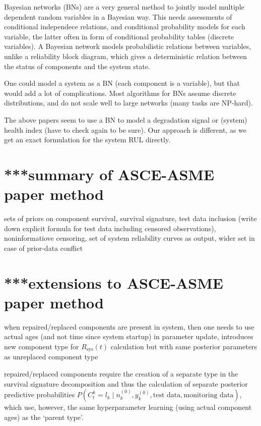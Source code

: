 \documentclass[authoryear]{elsarticle}
\newcommand{\uz}{^{(0)}} %
\newcommand{\Rsys}{R_\text{sys}}
\def\ykz{y\uz_k}
\def\nkz{n\uz_k}
\begin{document}
\begin{scriptsize}
Bayesian networks (BNs) are a very general method to jointly model multiple dependent random variables in a Bayesian way. 
This needs assessments of conditional independece relations, and conditional probability models for each variable,
the latter often in form of conditional probability tables (discrete variables).
A Bayesian network models probabilistic relations between variables,
unlike a reliability block diagram, which gives a deterministic relation
between the status of components and the system state.

One could model a system as a BN (each component is a variable),
but that would add a lot of complications.
Most algorithms for BNs assume discrete distributions,
and do not scale well to large networks (many tasks are NP-hard).

The above papers seem to use a BN to model a degradation signal or (system) health index (have to check again to be sure).
Our approach is different, as we get an exact formulation for the system RUL directly.

\end{scriptsize}


\section{***summary of ASCE-ASME paper method}

sets of priors on component survival,
survival signature,
test data inclusion
(write down explicit formula for test data including censored observations),
noninformatiove censoring,
set of system reliability curves as output,
wider set in case of prior-data conflict


\section{***extensions to ASCE-ASME paper method}
\label{sec:extensions}

when repaired/replaced components are present in system,
then one needs to use actual ages (and not time since system startup) in parameter update,
introduces new component type for $\Rsys(t)$ calculation but with same posterior parameters as unreplaced component type

repaired/replaced components require the creation of a separate type in the survival signature decomposition
and thus the calculation of separate posterior predictive probabilities
$P(C^k_t = l_k \mid \nkz,\ykz,\text{test data},\text{monitoring data})$,
which use, however, the same hyperparameter learning (using actual component ages) as the `parent type'.
\end{document}
